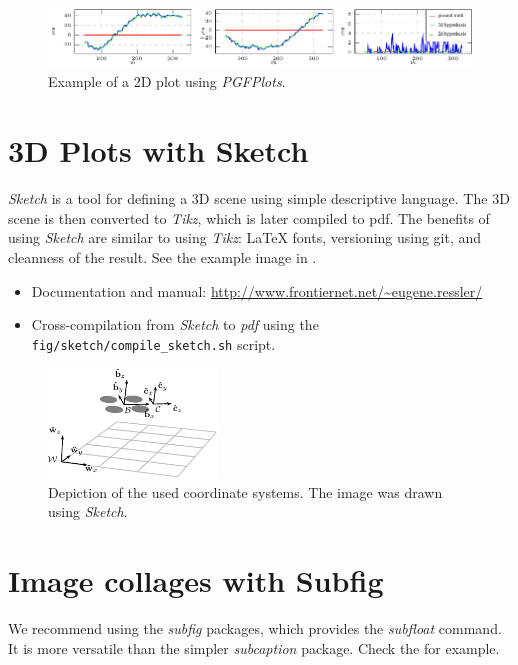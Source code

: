 \begin{figure}[htbp]
  \centering
  \includegraphics[width=1.0\textwidth]{./fig/plots/example_plot/hypotheses.pdf}
  \caption{Example of a 2D plot using \emph{PGFPlots}.}
  \label{fig:pgfplots_data}
\end{figure}

\section{3D Plots with Sketch}

\emph{Sketch} is a tool for defining a 3D scene using simple descriptive language.
The 3D scene is then converted to \emph{Tikz}, which is later compiled to pdf.
The benefits of using \emph{Sketch} are similar to using \emph{Tikz}: LaTeX fonts, versioning using git, and cleanness of the result.
See the example image in .
\begin{itemize}
  \item Documentation and manual: \url{http://www.frontiernet.net/~eugene.ressler/}
  \item Cross-compilation from \emph{Sketch} to \emph{pdf} using the \texttt{fig/sketch/compile\_sketch.sh} script.
\end{itemize}

\begin{figure}[htbp]
  \centering
  \includegraphics[width=0.4\textwidth]{./fig/sketch/coordinate_frames.pdf}
  \caption{Depiction of the used coordinate systems. The image was drawn using \emph{Sketch}.}
  \label{fig:coordinate_systems}
\end{figure}

\section{Image collages with Subfig}

We recommend using the \emph{subfig} packages, which provides the \emph{subfloat} command.
It is more versatile than the simpler \emph{subcaption} package.
Check the  for example.

